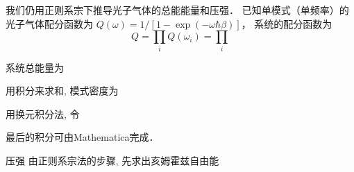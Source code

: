 

我们仍用正则系宗下推导光子气体的总能能量和压强． 已知单模式（单频率）的光子气体配分函数为 $Q(\omega) = 1/[1-\exp(-\omega\hbar\beta)]$， 系统的配分函数为
\begin{equation}
Q = \prod_i Q(\omega_i) = \prod_i
\end{equation}


系统总能量为
 
用积分来求和, 模式密度为 
 
用换元积分法, 令 
 
最后的积分可由Mathematica完成．

压强
由正则系宗法的步骤, 先求出亥姆霍兹自由能
 
